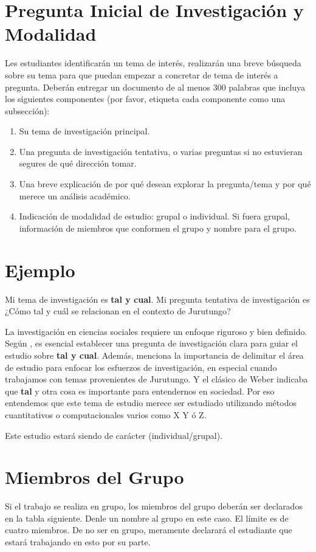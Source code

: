 \documentclass[11pt]{article}
\begin{document}
\section*{Pregunta Inicial de Investigación y Modalidad}
Les estudiantes identificarán un tema de interés, realizarán una breve búsqueda sobre su tema para que puedan empezar a concretar de tema de interés a pregunta. Deberán entregar un documento de al menos 300 palabras que incluya los siguientes componentes (por favor, etiqueta cada componente como una subsección):
\begin{enumerate}
    \item Su tema de investigación principal.
    \item Una pregunta de investigación tentativa, o varias preguntas si no estuvieran segures de qué dirección tomar.
    \item Una breve explicación de por qué desean explorar la pregunta/tema y por qué merece un análisis académico.
    \item Indicación de modalidad de estudio: grupal o individual. Si fuera grupal, información de miembros que conformen el grupo y nombre para el grupo.
\end{enumerate}


\section*{Ejemplo}
Mi tema de investigación es \textbf{tal y cual}. Mi pregunta tentativa de investigación es ¿Cómo tal y cuál se relacionan en el contexto de Jurutungo?

La investigación en ciencias sociales requiere un enfoque riguroso y bien definido. Según \citet{Perez2021}, es esencial establecer una pregunta de investigación clara para guiar el estudio sobre \textbf{tal y cual}. Además, \citet{Gonzalez2022} menciona la importancia de delimitar el área de estudio para enfocar los esfuerzos de investigación, en especial cuando trabajamos con temas provenientes de Jurutungo. Y el clásico de Weber indicaba que \textbf{tal} y otra cosa es importante \citep{Weber1964} para entendernos en sociedad. Por eso entendemos que este tema de estudio merece ser estudiado utilizando métodos cuantitativos o computacionales varios como X Y ó Z.

Este estudio estará siendo de carácter (individual/grupal).

\section*{Miembros del Grupo}
Si el trabajo se realiza en grupo, los miembros del grupo deberán ser declarados en la tabla siguiente. Denle un nombre al grupo en este caso. El límite es de cuatro miembros. De no ser en grupo, meramente declarará el estudiante que estará trabajando en esto por su parte.
\end{document}
